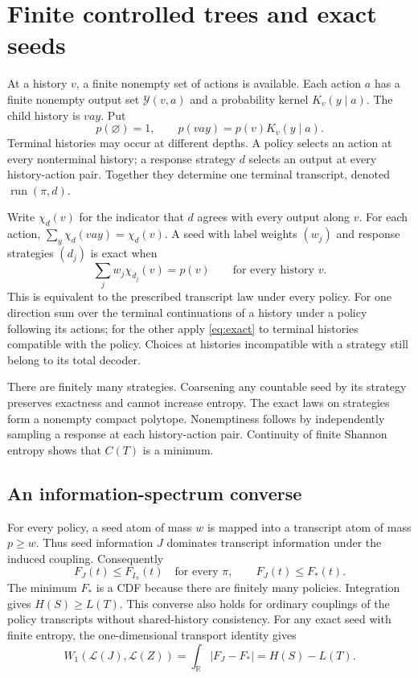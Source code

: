 \documentclass[11pt,a4paper]{article}
\theoremstyle{definition}\newtheorem{definition}[theorem]{Definition}
\theoremstyle{remark}\newtheorem{remark}[theorem]{Remark}
\newcommand{\R}{\mathbb R}
\numberwithin{equation}{section}
\begin{document}
\section{Finite controlled trees and exact seeds}\label{sec:finite}
At a history $v$, a finite nonempty set of actions is available. Each
action $a$ has a finite nonempty output set $\mathcal Y(v,a)$ and a
probability kernel $K_v(y\mid a)$. The child history is $vay$. Put
\[
 p(\varnothing)=1,\qquad p(vay)=p(v)K_v(y\mid a).
\]
Terminal histories may occur at different depths. A policy selects an
action at every nonterminal history; a response strategy $d$ selects an
output at every history-action pair. Together they determine one terminal
transcript, denoted $\operatorname{run}(\pi,d)$.

Write $\chi_d(v)$ for the indicator that $d$ agrees with every output
along $v$. For each action, $\sum_y\chi_d(vay)=\chi_d(v)$.
A seed with label weights $(w_j)$ and response strategies $(d_j)$ is exact
when
\begin{equation}\label{eq:exact}
 \sum_j w_j\chi_{d_j}(v)=p(v)\qquad\text{for every history }v.
\end{equation}
This is equivalent to the prescribed transcript law under every policy.
For one direction sum over the terminal continuations of a history under
a policy following its actions; for the other apply \eqref{eq:exact} to
terminal histories compatible with the policy. Choices at histories
incompatible with a strategy still belong to its total decoder.

There are finitely many strategies. Coarsening any countable seed by its
strategy preserves exactness and cannot increase entropy. The exact laws
on strategies form a nonempty compact polytope. Nonemptiness follows by
independently sampling a response at each history-action pair. Continuity
of finite Shannon entropy shows that $C(T)$ is a minimum.

\subsection{An information-spectrum converse}
For every policy, a seed atom of mass $w$ is mapped into a transcript atom
of mass $p\ge w$. Thus seed information $J$ dominates transcript information
under the induced coupling. Consequently
\begin{equation}\label{eq:lowercdf}
 F_J(t)\le F_{I_\pi}(t)\quad\text{for every }\pi,
 \qquad F_J(t)\le F_*(t).
\end{equation}
The minimum $F_*$ is a CDF because there are finitely many policies.
Integration gives $H(S)\ge L(T)$. This converse also holds for ordinary
couplings of the policy transcripts without shared-history consistency.
For any exact seed with finite entropy, the one-dimensional transport
identity gives
\begin{equation}\label{eq:Wgap}
 W_1(\mathcal L(J),\mathcal L(Z))
 =\int_\R|F_J-F_*|=H(S)-L(T).
\end{equation}
\end{document}
